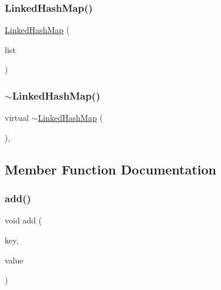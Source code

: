 \mbox{\label{classLinkedHashMap_a331f6cf326ea84040c60398eff855a99}} 
\subsubsection{\texorpdfstring{Linked\+Hash\+Map()}{LinkedHashMap()}\hspace{0.1cm}{\footnotesize\ttfamily [2/2]}}
{\footnotesize\ttfamily \mbox{\hyperlink{classLinkedHashMap}{Linked\+Hash\+Map}} (\begin{DoxyParamCaption}\item[{std\+::initializer\+\_\+list$<$ std\+::pair$<$ const Key\+Type, Value\+Type $>$$>$}]{list }\end{DoxyParamCaption})}

\mbox{\label{classLinkedHashMap_ab49c89d64a3b626757dd3c6150c02df9}} 
\subsubsection{\texorpdfstring{$\sim$\+Linked\+Hash\+Map()}{~LinkedHashMap()}}
{\footnotesize\ttfamily virtual $\sim$\mbox{\hyperlink{classLinkedHashMap}{Linked\+Hash\+Map}} (\begin{DoxyParamCaption}{ }\end{DoxyParamCaption})\hspace{0.3cm}{\ttfamily [virtual]}, {\ttfamily [default]}}



\subsection{Member Function Documentation}
\mbox{\label{classLinkedHashMap_a9129d6095063e7e14d85c627d35086a5}} 
\subsubsection{\texorpdfstring{add()}{add()}}
{\footnotesize\ttfamily void add (\begin{DoxyParamCaption}\item[{const Key\+Type \&}]{key,  }\item[{const Value\+Type \&}]{value }\end{DoxyParamCaption})}

